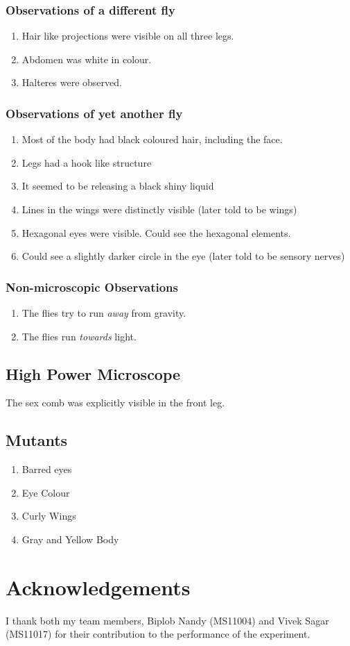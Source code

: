 		\subsubsection*{Observations of a different fly}
			\begin{enumerate}
				\item Hair like projections were visible on all three legs.
				\item Abdomen was white in colour.
				\item Halteres were observed.
			\end{enumerate}

		\subsubsection*{Observations of yet another fly}
			\begin{enumerate}
				\item Most of the body had black coloured hair, including the face.
				\item Legs had a hook like structure
				\item It seemed to be releasing a black shiny liquid
				\item Lines in the wings were distinctly visible (later told to be wings)
				\item Hexagonal eyes were visible. Could see the hexagonal elements.
				\item Could see a slightly darker circle in the eye (later told to be sensory nerves)
			\end{enumerate}

		\subsubsection*{Non-microscopic Observations}
			\begin{enumerate}
				\item The flies try to run \emph{away} from gravity.
				\item The flies run \emph{towards} light.
			\end{enumerate}
	\subsection{High Power Microscope}
		The sex comb was explicitly visible in the front leg.
	\subsection{Mutants}
		\begin{enumerate}
			\item Barred eyes
			\item Eye Colour
			\item Curly Wings
			\item Gray and Yellow Body
		\end{enumerate}
\section{Acknowledgements}
I thank both my team members, Biplob Nandy (MS11004) and Vivek Sagar (MS11017) for their contribution to the performance of the experiment. 